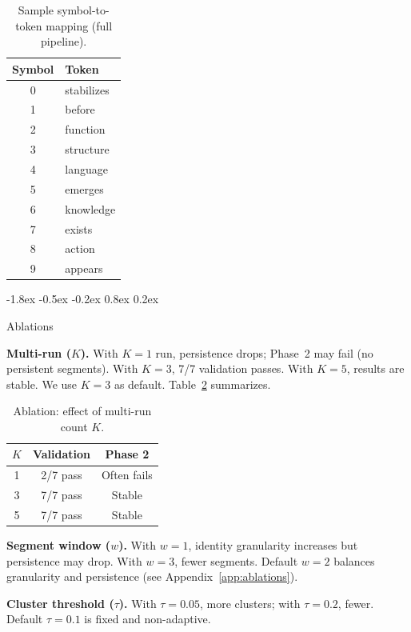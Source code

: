 \documentclass[10pt]{article}
\makeatletter
\renewcommand{\subsection}{\@startsection{subsection}{2}{\z@}%
  {-1.8ex \@plus -0.5ex \@minus -0.2ex}%
  {0.8ex \@plus 0.2ex}%
  {\normalsize\bfseries\raggedright}}
\makeatother
\begin{document}
\begin{table}[t]
\centering
\caption{Sample symbol-to-token mapping (full pipeline).}
\label{tab:symbols}
\begin{tabular}{cl}
\toprule
\textbf{Symbol} & \textbf{Token} \\
\midrule
0 & stabilizes \\
1 & before \\
2 & function \\
3 & structure \\
4 & language \\
5 & emerges \\
6 & knowledge \\
7 & exists \\
8 & action \\
9 & appears \\
\bottomrule
\end{tabular}
\end{table}

\subsection{Ablations}

\textbf{Multi-run ($K$).}
With $K=1$ run, persistence drops; Phase~2 may fail (no persistent segments). With
$K=3$, 7/7 validation passes. With $K=5$, results are stable. We use $K=3$ as default.
Table~\ref{tab:ablation_k} summarizes.

\begin{table}[t]
\centering
\caption{Ablation: effect of multi-run count $K$.}
\label{tab:ablation_k}
\begin{tabular}{ccc}
\toprule
$K$ & Validation & Phase 2 \\
\midrule
1 & 2/7 pass & Often fails \\
3 & 7/7 pass & Stable \\
5 & 7/7 pass & Stable \\
\bottomrule
\end{tabular}
\end{table}

\textbf{Segment window ($w$).}
With $w=1$, identity granularity increases but persistence may drop. With $w=3$, fewer
segments. Default $w=2$ balances granularity and persistence
(see Appendix~\ref{app:ablations}).

\textbf{Cluster threshold ($\tau$).}
With $\tau=0.05$, more clusters; with $\tau=0.2$, fewer. Default $\tau=0.1$ is
fixed and non-adaptive.
\end{document}
